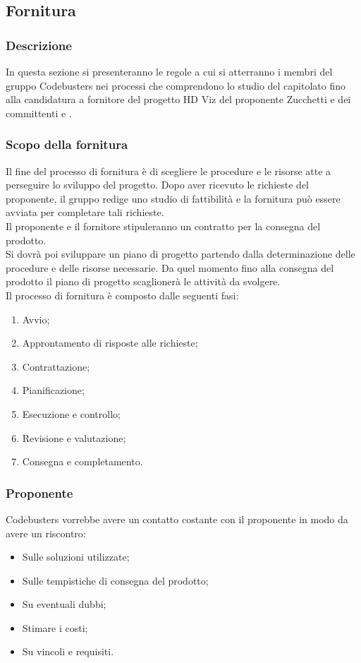 \subsection{Fornitura}
\subsubsection{Descrizione}
In questa sezione si presenteranno le regole a cui si atterranno i membri del gruppo Codebusters nei processi che comprendono lo studio del capitolato fino alla candidatura a fornitore del progetto HD Viz del proponente Zucchetti e dei committenti \VT  e \CR .  
\subsubsection{Scopo della fornitura}
Il fine del processo di fornitura è di scegliere le procedure e le risorse atte a perseguire lo sviluppo del progetto. Dopo aver ricevuto le richieste del proponente, il gruppo redige uno studio di fattibilità e la fornitura può essere avviata per completare tali richieste.\\
Il proponente e il fornitore stipuleranno un contratto per la consegna del prodotto.\\
Si dovrà poi sviluppare un piano di progetto partendo dalla determinazione delle procedure e delle risorse necessarie.
Da quel momento fino alla consegna del prodotto il piano di progetto scaglionerà le attività da svolgere. \\
 Il processo di fornitura è composto dalle seguenti fasi:
 \begin{enumerate}
 \item Avvio; 
\item Approntamento di risposte alle richieste;
\item Contrattazione;
\item Pianificazione;
\item Esecuzione e controllo;
\item Revisione e valutazione;
\item Consegna e completamento.
 \end{enumerate}
\subsubsection{Proponente}
Codebusters vorrebbe avere un contatto costante con il proponente in modo da avere un riscontro:
\begin{itemize}
\item Sulle soluzioni utilizzate;
\item Sulle tempistiche di consegna del prodotto;
\item Su eventuali dubbi;
\item Stimare i costi;
\item Su vincoli e requisiti.
\end{itemize}
